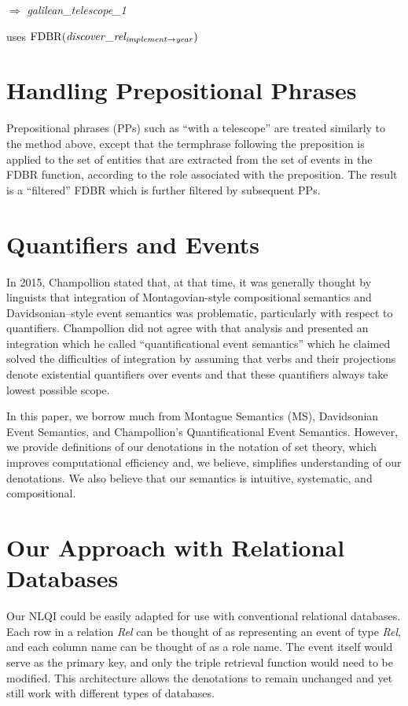 \documentclass[../main.tex]{subfiles}
\begin{document}
\begin{refsection}
$\Rightarrow$  \textit{galilean\_telescope\_1}

uses $\mathrm{FDBR}({\mathit{discover\_rel_{implement \rightarrow year}}})$

\section{Handling Prepositional Phrases}

Prepositional phrases (PPs) such as ``with a telescope'' are treated
similarly to the method above, except that the termphrase
following the preposition is applied to the set of entities that are extracted from
the set of events in the FDBR function, according to the role associated with
the preposition. The result is a ``filtered'' FDBR which is further filtered by
subsequent PPs.

\section{Quantifiers and Events}
\label{webist2019conf:quant}
In 2015, Champollion \cite{champollion2015interaction} stated that, at that time, it was generally thought by linguists that integration of Montagovian-style compositional semantics and Davidsonian–style event semantics \cite{parsons1990events,davidson1967logical} was problematic, particularly with respect to quantifiers. Champollion did not agree with that analysis and presented an integration which he called ``quantificational event semantics'' which he claimed solved the difficulties of integration by assuming that verbs and their projections denote existential quantifiers over events and that these quantifiers always take lowest possible scope.

In this paper, we borrow much from Montague Semantics (MS), Davidsonian Event Semantics,
and Champollion's Quantificational Event Semantics. However, we provide definitions of our
denotations in the notation of set theory, which improves computational efficiency and, we
believe, simplifies understanding of our denotations. We also believe that our semantics is
intuitive, systematic, and compositional.

\section{Our Approach with Relational Databases}

Our NLQI could be easily adapted for use with conventional relational databases. 
Each row in a relation \textit{Rel} can be thought of as representing an event of type \textit{Rel}, and each column name can be thought of as a role name.  The event itself would serve as the primary key, and only the triple retrieval function would need to be modified.  This architecture allows the denotations to remain unchanged and yet still work with different types of databases.


\end{refsection}
\end{document}
